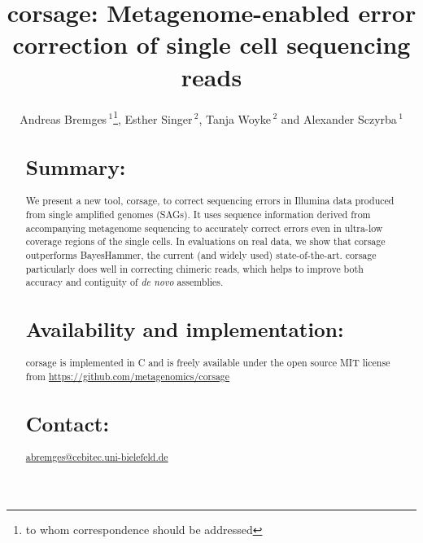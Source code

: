 \documentclass{bioinfo}
\begin{document}

\title[Metagenome-enabled error correction]{corsage: Metagenome-enabled error correction of single cell sequencing reads}

\author[Bremges \textit{et~al.}]{Andreas Bremges\,$^{1}$\footnote{to whom correspondence should be addressed}, Esther Singer\,$^{2}$, Tanja Woyke\,$^{2}$ and Alexander Sczyrba\,$^{1}$}

\address{$^{1}$Center for Biotechnology \& Faculty of Technology, Bielefeld University, 33615 Bielefeld, Germany\\
$^{2}$U.S. Department of Energy Joint Genome Institute, Walnut Creek, CA 94598, USA}

\maketitle

\begin{abstract}
\section{Summary:} We present a new tool, corsage, to correct sequencing errors in Illumina data produced from single amplified genomes (SAGs).
It uses sequence information derived from accompanying metagenome sequencing to accurately correct errors even in ultra-low coverage regions of the single cells.
In evaluations on real data, we show that corsage outperforms BayesHammer, the current (and widely used) state-of-the-art. %
corsage particularly does well in correcting chimeric reads, which helps to improve both accuracy and contiguity of \emph{de novo} assemblies.

\section{Availability and implementation:} corsage is implemented in C and is freely available under the open source MIT license from \href{https://github.com/metagenomics/corsage}{https://github.com/metagenomics/corsage} %

\section{Contact:} \href{mailto:abremges@cebitec.uni-bielefeld.de}{abremges@cebitec.uni-bielefeld.de}

\end{abstract}
\end{document}
